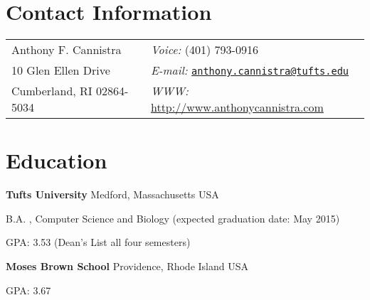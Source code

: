 \documentclass[margin,line]{res}
\newenvironment{list1}{
  \begin{list}{\ding{113}}{%
      \setlength{\itemsep}{0in}
      \setlength{\parsep}{0in} \setlength{\parskip}{0in}
      \setlength{\topsep}{0in} \setlength{\partopsep}{0in} 
      \setlength{\leftmargin}{0.17in}}}{\end{list}}
\newenvironment{list2}{
  \begin{list}{$-$}{%
      \setlength{\itemsep}{0in}
      \setlength{\parsep}{0in} \setlength{\parskip}{0in}
      \setlength{\topsep}{0in} \setlength{\partopsep}{0in} 
      \setlength{\leftmargin}{0.2in}}}{\end{list}}
\begin{document}
\begin{resume}
\section{\sc Contact Information}
\vspace{.05in}
\begin{tabular}{@{}p{2in}p{4in}}
Anthony F. Cannistra & {\it Voice:}  (401) 793-0916 \\            
10 Glen Ellen Drive & {\it E-mail:}  \href{mailto:anthony.cannistra@tufts.edu}{\nolinkurl{anthony.cannistra@tufts.edu}}\\         
Cumberland, RI 02864-5034 & {\it WWW:} \url{http://www.anthonycannistra.com}
\end{tabular}
\section{\sc Education}
{\bf Tufts University} Medford, Massachusetts USA\\
\vspace*{-.1in}
\begin{list1}
\item[] B.A. , Computer Science and Biology (expected graduation date: May 2015)
\item[] GPA: 3.53 (Dean's List all four semesters)
\end{list1}
{\bf Moses Brown School} Providence, Rhode Island USA \\
\vspace*{-.1in}

\begin{list1}
\item [] GPA: 3.67
\end{list1}

\end{resume}
\end{document}
